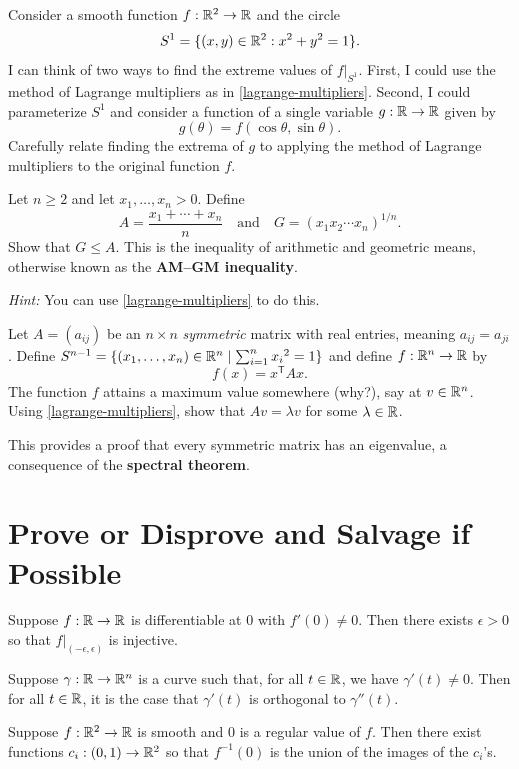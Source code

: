 \documentclass{homework}
\begin{document}
\begin{problem}
  Consider a smooth function $f : \mathbb{R}^2 \to \mathbb{R}$ and the circle
  \[
    S^1 = \{ (x,y) \in \mathbb{R}^2 : x^2 + y^2 = 1 \}.
  \]
  I can think of two ways to find the extreme values of $f |_{S^1}$.  First, I could use the method of Lagrange multipliers as in \ref{lagrange-multipliers}. Second, I could parameterize $S^1$ and consider a function of a single variable $g : \mathbb{R} \to \mathbb{R}$ given by
  \[
    g(\theta) = f(\cos \theta, \sin\theta).
  \]
  Carefully relate finding the extrema of $g$ to applying the method of Lagrange multipliers to the original function $f$.
\end{problem}

\begin{problem}
Let $n\ge 2$ and let $x_1,\dots,x_n>0$. Define 
\[
A=\frac{x_1+\cdots+x_n}{n}
\quad\text{and}\quad
G=(x_1x_2\cdots x_n)^{1/n}.
\]
Show that $G \le A$. This is the inequality of arithmetic and geometric means, otherwise known as the \textbf{AM--GM inequality}.

\textit{Hint:} You can use \ref{lagrange-multipliers} to do this.
\end{problem}

\begin{problem}
  Let $A = (a_{ij})$ be an $n\times n$ \emph{symmetric} matrix with real entries, meaning $a_{ij} = a_{ji}$. Define $S^{n-1} = \{ (x_1,\ldots,x_n) \in \mathbb{R}^n \mid \sum_{i=1}^n {x_i}^2 = 1 \}$ and define $f : \mathbb{R}^n \to \mathbb{R}$ by
\[
f(x) = x^{\mathsf T}Ax.
\]
The function $f$ attains a maximum value somewhere (why?), say at $v \in \mathbb{R}^n$. Using \ref{lagrange-multipliers}, show that $Av = \lambda v$ for some $\lambda \in \mathbb{R}$.

This provides a proof that every symmetric matrix has an eigenvalue, a consequence of the \textbf{spectral theorem}.
\end{problem}

\section{Prove or Disprove and Salvage if Possible}

\begin{problem}
  Suppose $f : \mathbb{R} \to \mathbb{R}$ is differentiable at $0$ with $f'(0) \neq 0$. Then there exists $\epsilon > 0$ so that $f |_{(-\epsilon,\epsilon)}$ is injective.
\end{problem}

\begin{problem}
  Suppose $\gamma : \mathbb{R} \to \mathbb{R}^n$ is a curve such that, for all $t \in \mathbb{R}$, we have $\gamma'(t) \neq 0$. Then for all $t \in \mathbb{R}$, it is the case that $\gamma'(t)$ is orthogonal to $\gamma''(t)$.
\end{problem}

\begin{problem}
  Suppose $f : \mathbb{R}^2 \to \mathbb{R}$ is smooth and $0$ is a regular value of $f$. Then there exist functions $c_i : (0,1) \to \mathbb{R}^2$ so that $f^{-1}(0)$ is the union of the images of the $c_i$'s.
\end{problem}
\end{document}
